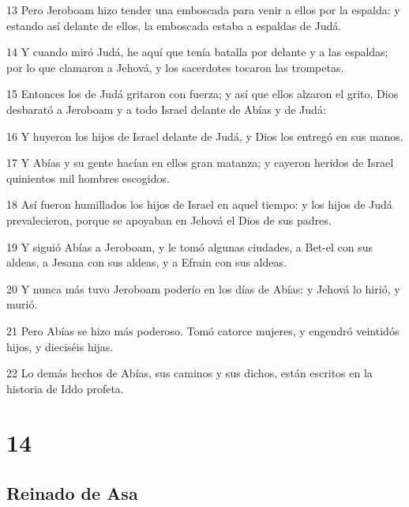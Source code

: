 \par 13 Pero Jeroboam hizo tender una emboscada para venir a ellos por la espalda: y estando así delante de ellos, la emboscada estaba a espaldas de Judá.
\par 14 Y cuando miró Judá, he aquí que tenía batalla por delante y a las espaldas; por lo que clamaron a Jehová, y los sacerdotes tocaron las trompetas.
\par 15 Entonces los de Judá gritaron con fuerza; y así que ellos alzaron el grito, Dios desbarató a Jeroboam y a todo Israel delante de Abías y de Judá:
\par 16 Y huyeron los hijos de Israel delante de Judá, y Dios los entregó en sus manos.
\par 17 Y Abías y su gente hacían en ellos gran matanza; y cayeron heridos de Israel quinientos mil hombres escogidos.
\par 18 Así fueron humillados los hijos de Israel en aquel tiempo: y los hijos de Judá prevalecieron, porque se apoyaban en Jehová el Dios de sus padres.
\par 19 Y siguió Abías a Jeroboam, y le tomó algunas ciudades, a Bet-el con sus aldeas, a Jesana con sus aldeas, y a Efrain con sus aldeas.
\par 20 Y nunca más tuvo Jeroboam poderío en los días de Abías: y Jehová lo hirió, y murió.
\par 21 Pero Abías se hizo más poderoso. Tomó catorce mujeres, y engendró veintidós hijos, y dieciséis hijas.
\par 22 Lo demás hechos de Abías, sus caminos y sus dichos, están escritos en la historia de Iddo profeta.

\chapter{14}

\section*{Reinado de Asa}

